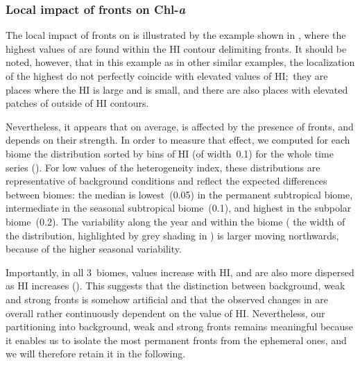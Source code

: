 \subsubsection{Local impact of fronts on Chl-\textit{a}}

The local impact of fronts on  is illustrated by the example shown in , where the highest values of  are found within the HI contour delimiting fronts.
It should be noted, however, that in this example as in other similar examples, the localization of the highest  do not perfectly coincide with elevated values of HI;\ they are places where the HI is large and  is small, and there are also places with elevated patches of  outside of HI contours.

Nevertheless, it appears that on average,  is affected by the presence of fronts, and depends on their strength.
In order to measure that effect, we computed for each biome the  distribution sorted by bins of HI (of width~\num{0.1}) for the whole time series ().
For low values of the heterogeneity index, these distributions are representative of background conditions and reflect the expected differences between biomes: the median  is lowest~(\qty{0.05}{\mgm}) in the permanent subtropical biome, intermediate in the seasonal subtropical biome~(\qty{0.1}{\mgm}), and highest in the subpolar biome~(\qty{0.2}{\mgm}).
The  variability along the year and within the biome ( the width of the distribution, highlighted by grey shading in ) is larger moving northwards, because of the higher seasonal variability.

Importantly, in all 3~biomes,  values increase with HI, and are also more dispersed as HI increases ().
This suggests that the distinction between background, weak and strong fronts is somehow artificial and that the observed changes in  are overall rather continuously dependent on the value of HI\@.
Nevertheless, our partitioning into background, weak and strong fronts remains meaningful because it enables us to isolate the most permanent fronts from the ephemeral ones, and we will therefore retain it in the following.


